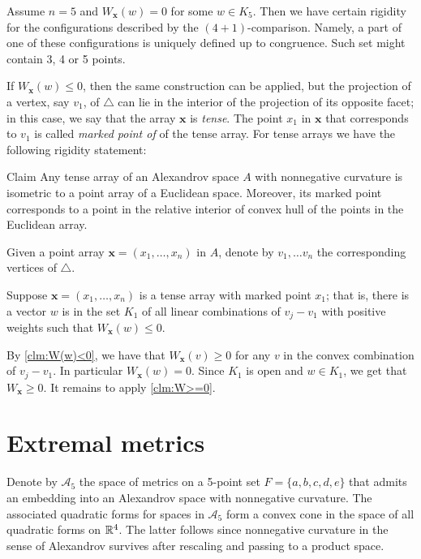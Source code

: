 \documentclass{article}
\begin{document}
Assume $n=5$ and $W_{\bm{x}}(w)=0$ for some $w\in K_5$.
Then we have certain rigidity for the configurations described by the $(4+1)$-comparison.
Namely, a part of one of these configurations is uniquely defined up to congruence.
Such set might contain 3, 4 or 5 points.


If $W_{\bm{x}}(w)\le0$, then the same construction can be applied, but the projection of a vertex, say $v_1$, of $\triangle$ can lie in the interior of the projection of its opposite facet;
in this case, we say that the array $\bm{x}$ is \emph{tense}.
The point $x_1$ in $\bm{x}$ that corresponds to $v_1$ is called \emph{marked point of} of the tense array.
For tense arrays we have the following rigidity statement:

\begin{thm}{Claim}\label{clm:W(w)==0}
Any tense array of an Alexandrov space $A$ with nonnegative curvature is isometric to a point array of a Euclidean space.
Moreover, its marked point corresponds to a point in the relative interior of convex hull of the points in the Euclidean array.
\end{thm}

Given a point array $\bm{x}=(x_1,\dots,x_n)$ in $A$, denote by $v_1,\dots v_n$ the corresponding vertices of $\triangle$.

Suppose $\bm{x}=(x_1,\dots,x_n)$ is a tense array with marked point $x_1$;
that is, there is a vector $w$ is in the set $K_1$ of all linear combinations of $v_j-v_1$ with positive weights such that $W_{\bm{x}}(w)\le 0$. 

By \ref{clm:W(w)<0}, we have that $W_{\bm{x}}(v)\ge 0$ for any $v$ in the convex combination of $v_j-v_1$.
In particular $W_{\bm{x}}(w)=0$.
Since $K_1$ is open and $w\in K_1$, we get that $W_{\bm{x}}\ge 0$.
It remains to apply \ref{clm:W>=0}.
\qeds

\section{Extremal metrics}\label{sec:ext}

Denote by $\mathcal{A}_5$ the space of metrics on a 5-point set $F=\{a,b,c,d,e\}$ that admits an embedding into an Alexandrov space with nonnegative curvature.
The associated quadratic forms for spaces in $\mathcal{A}_5$ form a convex cone in the space of all quadratic forms on $\mathbb{R}^4$.
The latter follows since nonnegative curvature in the sense of Alexandrov survives after rescaling and passing to a product space.
\end{document}
